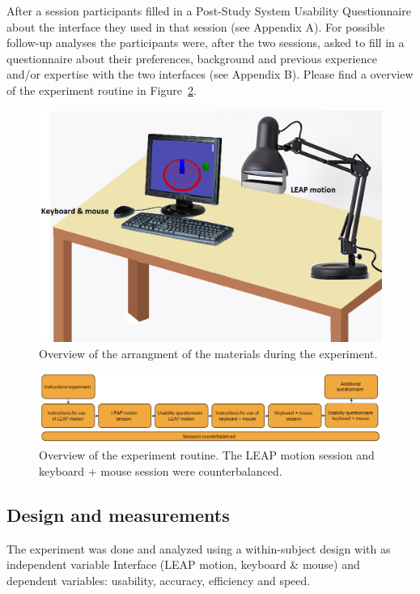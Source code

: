 After a session participants filled in a Post-Study System Usability Questionnaire about the interface they used in that session (see Appendix A). 
For possible follow-up analyses the participants were, after the two sessions, asked to fill in a questionnaire about their preferences, background and previous experience and/or expertise with the two interfaces (see Appendix B). Please find a overview of the experiment routine in Figure~\ref{fig:experimentroutine}.
\begin{figure}
\includegraphics[width=\textwidth]{imgs/configuration}
\caption{Overview of the arrangment of the materials during the experiment.}
\label{fig:configuration}
\end{figure}

\begin{figure}
\includegraphics[width=\textwidth]{imgs/experimentroutine}
\caption{Overview of the experiment routine. The LEAP motion session and keyboard + mouse session were counterbalanced.}
\label{fig:experimentroutine}
\end{figure}


\subsection{Design and measurements}
The experiment was done and analyzed using a within-subject design with as independent variable Interface (LEAP motion, keyboard \& mouse) and dependent variables: usability, accuracy, efficiency and speed. 

